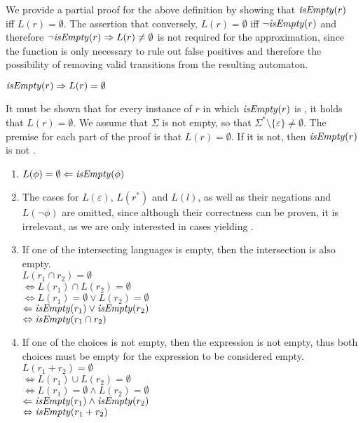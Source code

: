 We provide a partial proof for the above definition by showing that
$\mathit{isEmpty}(r)$ iff $L(r) = \emptyset$. The assertion that conversely, $L(r) =
\emptyset$ iff $\neg\mathit{isEmpty}(r)$ and therefore $\neg\mathit{isEmpty}(r) \Rightarrow L(r)
\neq \emptyset$ is not required for the approximation, since the function is
only necessary to rule out false positives and therefore the possibility of
removing valid transitions from the resulting automaton.

\begin{lem}
   $\mathit{isEmpty}(r) \Rightarrow L(r) = \emptyset$

   \proof
   It must be shown that for every instance of $r$ in which $\mathit{isEmpty}(r)$ is
   \true, it holds that $L(r) = \emptyset$. We assume that $\Sigma$ is not empty,
   so that $\Sigma^* \setminus \{\varepsilon\} \neq \emptyset$. The premise for
   each part of the proof is that $L(r) = \emptyset$. If it is not, then
   $\mathit{isEmpty}(r)$ is not \true.

   \begin{enumerate}[label=\textbf{(\arabic*)}]
      \item
         $L(\phi) = \emptyset \Leftarrow \mathit{isEmpty}(\phi)$

      \item
         The cases for $L(\varepsilon)$, $L(r^*)$ and $L(l)$, as well as their
         negations and $L(\neg \phi)$ are omitted, since although their
         correctness can be proven, it is irrelevant, as we are only interested
         in cases yielding \true.

      \item
         If one of the intersecting languages is empty, then the intersection is
         also empty. \\
         $L(r_1 \cap r_2) = \emptyset$ \\
         $\Leftrightarrow L(r_1) \cap L(r_2) = \emptyset$ \\
         $\Leftrightarrow L(r_1) = \emptyset \vee L(r_2) = \emptyset$ \\
         $\Leftarrow \mathit{isEmpty}(r_1) \vee \mathit{isEmpty}(r_2)$ \\
         $\Leftrightarrow \mathit{isEmpty}(r_1 \cap r_2)$

      \item
         If one of the choices is not empty, then the expression is not empty,
         thus both choices must be empty for the expression to be considered
         empty. \\
         $L(r_1 + r_2) = \emptyset$ \\
         $\Leftrightarrow L(r_1) \cup L(r_2) = \emptyset$ \\
         $\Leftrightarrow L(r_1) = \emptyset \wedge L(r_2) = \emptyset$ \\
         $\Leftarrow \mathit{isEmpty}(r_1) \wedge \mathit{isEmpty}(r_2)$ \\
         $\Leftrightarrow \mathit{isEmpty}(r_1 + r_2)$


\end{enumerate}
\end{lem}
